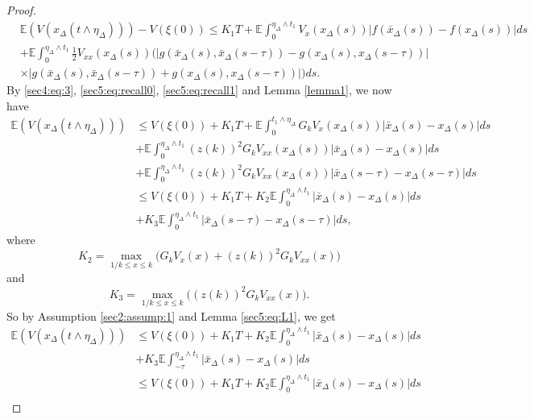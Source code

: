 \documentclass[10pt,a4paper]{amsart}
\begin{document}
\begin{proof}
\begin{align*}
&\mathbb{E}(V(x_{\Delta}(t\wedge \eta_{\Delta})))-V(\xi(0))\le K_1T+\mathbb{E}\int_{0}^{\eta_{\Delta}\wedge t_1}V_x(x_{\Delta}(s))\vert f(\bar{x}_{\Delta}(s))-f(x_{\Delta}(s))\vert ds\\
&+\mathbb{E}\int_{0}^{\eta_{\Delta}\wedge t_1}\frac{1}{2}V_{xx}(x_{\Delta}(s))\Big(\vert g(\bar{x}_{\Delta}(s),\bar{x}_{\Delta}(s-\tau))-g(x_{\Delta}(s),x_{\Delta}(s-\tau))\vert\\
&\times \vert g(\bar{x}_{\Delta}(s),\bar{x}_{\Delta}(s-\tau))+g(x_{\Delta}(s),x_{\Delta}(s-\tau))\vert \Big) ds.
\end{align*}
By \eqref{sec4:eq:3}, \eqref{sec5:eq:recall0}, \eqref{sec5:eq:recall1} and Lemma \ref{lemma1}, we now have
\begin{align*}
\mathbb{E}(V(x_{\Delta}(t\wedge \eta_{\Delta})))&\le V(\xi(0))+K_1T+\mathbb{E}\int_{0}^{t_1\wedge\eta_{\Delta}}G_kV_x(x_{\Delta}(s))\vert \bar{x}_{\Delta}(s)-x_{\Delta}(s)\vert ds\\
&+\mathbb{E}\int_{0}^{\eta_{\Delta}\wedge t_1}(z(k))^2G_kV_{xx}(x_{\Delta}(s))\vert \bar{x}_{\Delta}(s)-x_{\Delta}(s)\vert ds\\
&+\mathbb{E}\int_{0}^{\eta_{\Delta}\wedge t_1}(z(k))^2G_kV_{xx}(x_{\Delta}(s))\vert \bar{x}_{\Delta}(s-\tau)-x_{\Delta}(s-\tau)\vert ds\\
&\le V(\xi(0))+K_1T+K_2\mathbb{E}\int_0^{\eta_{\Delta}\wedge t_1} \vert \bar{x}_{\Delta}(s)-x_{\Delta}(s)\vert ds\\
&+K_3\mathbb{E}\int_{0}^{\eta_{\Delta}\wedge t_1}\vert \bar{x}_{\Delta}(s-\tau)-x_{\Delta}(s-\tau)\vert ds,
\end{align*}
where
\begin{equation*}
K_2=\max_{1/k\le x\le k}\Big(G_kV_x(x)+(z(k))^2G_kV_{xx}(x)\Big)
\end{equation*}
and
\begin{equation*}
K_3=\max_{1/k\le x\le k}\Big((z(k))^2G_kV_{xx}(x)\Big).
\end{equation*}
So by Assumption \ref{sec2:assump:1} and Lemma \ref{sec5:eq:L1}, we get
\begin{align*}
\mathbb{E}(V(x_{\Delta}(t\wedge \eta_{\Delta})))&\le V(\xi(0))+K_1T+K_2\mathbb{E}\int_0^{\eta_{\Delta}\wedge t_1} \vert \bar{x}_{\Delta}(s)-x_{\Delta}(s)\vert ds\\
&+K_3\mathbb{E}\int_{-\tau}^{\eta_{\Delta}\wedge t_1}\vert \bar{x}_{\Delta}(s)-x_{\Delta}(s)\vert ds\\
&\le V(\xi(0))+K_1T+
K_2\mathbb{E}\int_{0}^{\eta_{\Delta}\wedge t_1} \vert \bar{x}_{\Delta}(s)-x_{\Delta}(s)\vert ds\\

\end{align*}
\end{proof}
\end{document}

